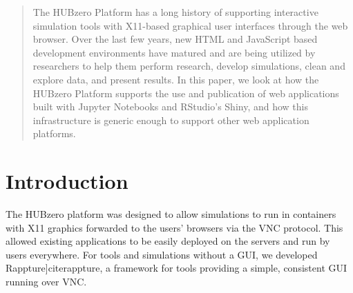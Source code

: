 \documentclass[conference]{../sty/IEEEtran}
\begin{document}




\maketitle

\begin{abstract}
The HUBzero Platform has a long history of supporting interactive simulation tools with X11-based graphical user interfaces through the web browser. Over the last few years, new HTML and JavaScript based development environments have matured and are being utilized by researchers to help them perform research, develop simulations, clean and explore data, and present results. In this paper, we look at how the HUBzero Platform supports the use and publication of web applications built with Jupyter Notebooks and RStudio’s Shiny, and how this infrastructure is generic enough to support other web application platforms.
\end{abstract}



%
\IEEEpeerreviewmaketitle



\section{Introduction}
 
The HUBzero platform was designed to allow simulations to run in containers with X11 graphics forwarded to the users' browsers via the VNC protocol.
This allowed existing applications to be easily deployed on the servers and run by users everywhere.  For tools and simulations without a GUI, we developed Rappture]cite{rappture}, a framework for tools providing a simple, consistent GUI running over VNC.
 
\end{document}
